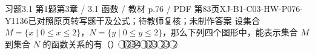 \par\noindent\begin{minipage}{\linewidth}
\begin{bankitem}{习题3.1 第1题}{第3章 / 3.1 函数 / 教材 p.76 / PDF 第83页}{XJ-B1-C03-HW-P076-Y1136}{已对照原页转写题干及公式；待教师复核；未制作答案}
设集合 $M=\{x\mid0\le x\le2\}$，$N=\{y\mid0\le y\le2\}$，那么下列四个图形中，能表示集合 $M$ 到集合 $N$ 的函数关系的有（\quad）
\textcircled{1}\textcircled{2}\textcircled{3}\textcircled{4}
\textcircled{1}\textcircled{2}\textcircled{3}
\textcircled{2}\textcircled{3}
\textcircled{2}
\end{bankitem}
\end{minipage}\par\medskip
